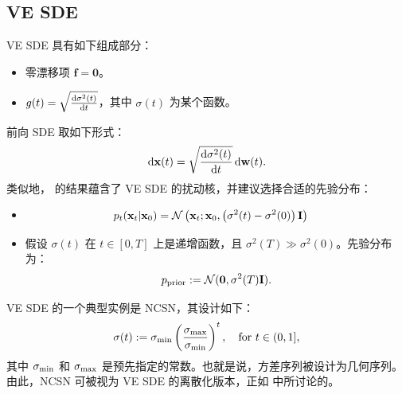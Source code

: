 \subsection{VE SDE}
VE SDE 具有如下组成部分：
\begin{itemize}
    \item {}零漂移项 $\mathbf{f}=\bm{0}$。
    \item {}$g(t)=\sqrt{\frac{\mathop{}\!\mathrm{d} \sigma^2(t)}{\mathop{}\!\mathrm{d} t}}$，其中 $\sigma(t)$ 为某个函数。
\end{itemize}
前向 SDE 取如下形式：
\begin{equation}\label{eq:vesde}
    \mathop{}\!\mathrm{d}{\mathbf{x}}(t) =  \sqrt{\frac{\mathop{}\!\mathrm{d} \sigma^2(t)}{\mathop{}\!\mathrm{d} t}} \mathop{}\!\mathrm{d}{\mathbf{w}}(t).
\end{equation} 
类似地， 的结果蕴含了 VE SDE 的扰动核，并建议选择合适的先验分布：
\begin{itemize}
    \item {}
\begin{align*}
        p_t({\mathbf{x}}_t | {\mathbf{x}}_0) &= \mathcal{N}\left({\mathbf{x}}_t ; {\mathbf{x}}_0, \left(\sigma^2(t) - \sigma^2(0)\right){\mathbf{I}}\right) 
\end{align*}
    \item {}假设 $\sigma(t)$ 在 $t \in [0,T]$ 上是递增函数，且 $\sigma^2(T) \gg \sigma^2(0)$。先验分布为：
    \[
    p_{\mathrm{prior}} := \mathcal{N}(\bm{0}, \sigma^2(T){\mathbf{I}}).
    \]
\end{itemize}

VE SDE 的一个典型实例是 NCSN，其设计如下：
\[
\sigma(t):=\sigma_{\textup{min}}\left(\frac{\sigma_{\textup{max}}}{\sigma_{\textup{min}}} \right)^t,\quad \text{for } t\in(0,1],
\]
其中 $\sigma_{\textup{min}}$ 和 $\sigma_{\textup{max}}$ 是预先指定的常数。也就是说，方差序列被设计为几何序列。由此，NCSN 可被视为 VE SDE 的离散化版本，正如  中所讨论的。

